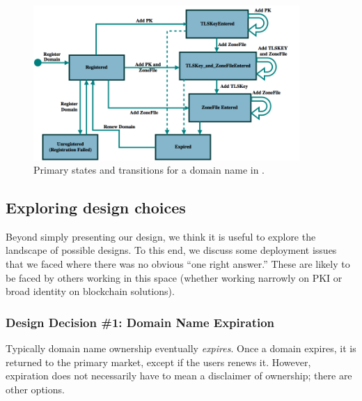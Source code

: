 \begin{figure}[htb!p]
\centering
\includegraphics[width=0.9\textwidth]{fig/StateDiagram-2.png}
\caption{\footnotesize{Primary states and transitions for a domain name in \Ghazal.}}
\end{figure}

\subsection{Exploring \Ghazal design choices}

Beyond simply presenting our design, we think it is useful to explore the landscape of possible designs. To this end, we discuss some deployment issues that we faced where there was no obvious ``one right answer.'' These are likely to be faced by others working in this space (whether working narrowly on PKI or broad identity on blockchain solutions). 


\subsubsection{Design Decision \#1: Domain Name Expiration\newline} 

Typically domain name ownership eventually \textit{expires}. Once a domain expires, it is returned to the primary market, except if the users renews it. However, expiration does not necessarily have to mean a disclaimer of ownership; there are other options. 

